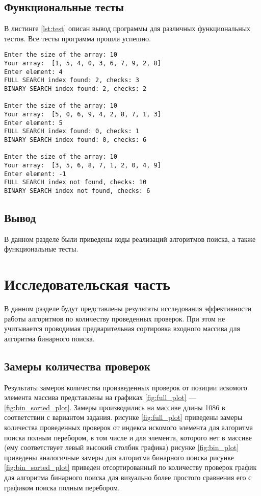 \documentclass{bmstu}
\begin{document}
\section{Функциональные тесты}
В листинге \ref{lst:test} описан вывод программы для различных функциональных тестов. Все тесты программа прошла успешно.
\begin{center}
\captionsetup{justification=raggedright,singlelinecheck=off}
\begin{lstlisting}[label=lst:test,caption=Функциональные тесты]
Enter the size of the array: 10
Your array:  [1, 5, 4, 0, 3, 6, 7, 9, 2, 8]
Enter element: 4
FULL SEARCH index found: 2, checks: 3
BINARY SEARCH index found: 2, checks: 2

Enter the size of the array: 10
Your array:  [5, 0, 6, 9, 4, 2, 8, 7, 1, 3]
Enter element: 5
FULL SEARCH index found: 0, checks: 1
BINARY SEARCH index found: 0, checks: 6

Enter the size of the array: 10
Your array:  [3, 5, 6, 8, 7, 1, 2, 0, 4, 9]
Enter element: -1
FULL SEARCH index not found, checks: 10
BINARY SEARCH index not found, checks: 6
\end{lstlisting}
\end{center}

\section*{Вывод}
В данном разделе были приведены коды реализаций алгоритмов поиска, а также функциональные тесты.



\chapter{Исследовательская часть}
В данном разделе будут представлены результаты исследования эффективности работы алгоритмов по количеству проведенных проверок. При этом не учитывается проводимая предварительная сортировка входного массива для алгоритма бинарного поиска.

\section{Замеры количества проверок}

Результаты замеров количества произведенных проверок от позиции искомого элемента массива представлены на графиках \ref{fig:full_plot} --- \ref{fig:bin_sorted_plot}.
Замеры производились на массиве длины 1086 в соответствии с вариантом задания.
 рисунке \ref{fig:full_plot} приведены замеры количества проведенных проверок от индекса искомого элемента для алгоритма поиска полным перебором, в том числе и для элемента, которого нет в массиве (ему соответствует левый высокий столбик графика)
 рисунке \ref{fig:bin_plot} приведены аналогичные замеры для алгоритма бинарного поиска
 рисунке \ref{fig:bin_sorted_plot} приведен отсортированный по количеству проверок график для алгоритма бинарного поиска для визуально более простого сравнения его с графиком поиска полным перебором.
\end{document}
